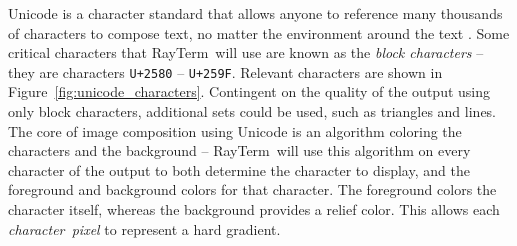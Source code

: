 \documentclass[11pt]{article}
\newcommand{\name}{{\sc RayTerm}}
\begin{document}
Unicode is a character standard that allows anyone to reference many thousands of characters to compose text, no matter the environment around the text \cite{unicode}.
Some critical characters that \name\ will use are known as the {\it block characters} -- they are characters \texttt{U+2580} -- \texttt{U+259F}.
Relevant characters are shown in Figure~\ref{fig:unicode_characters}.
Contingent on the quality of the output using only block characters, additional sets could be used, such as triangles and lines.
The core of image composition using Unicode is an algorithm coloring the characters and the background -- \name\ will use this algorithm on every character of the output to both determine the character to display, and the foreground and background colors for that character.
The foreground colors the character itself, whereas the background provides a relief color.
This allows each {\it character~pixel} to represent a hard gradient.
\end{document}
